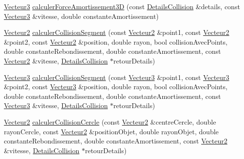 \begin{DoxyCompactItemize}
\hyperlink{group__utilitaire_ga541aa4837ad9250d3a248dc82ee9ad4d}{Vecteur3} \hyperlink{namespaceaidecollision_a2d14adb05414527ee23e93d54f656277}{calculer\-Force\-Amortissement3\-D} (const \hyperlink{classaidecollision_1_1_details_collision}{Details\-Collision} \&details, const \hyperlink{group__utilitaire_ga541aa4837ad9250d3a248dc82ee9ad4d}{Vecteur3} \&vitesse, double constante\-Amortissement)
\item 
\hyperlink{group__utilitaire_ga6f7808e68c967b90bd7e737b7e1b78de}{Vecteur2} \hyperlink{namespaceaidecollision_a85a0be1f19e12cd25413002996b24bb1}{calculer\-Collision\-Segment} (const \hyperlink{group__utilitaire_ga6f7808e68c967b90bd7e737b7e1b78de}{Vecteur2} \&point1, const \hyperlink{group__utilitaire_ga6f7808e68c967b90bd7e737b7e1b78de}{Vecteur2} \&point2, const \hyperlink{group__utilitaire_ga6f7808e68c967b90bd7e737b7e1b78de}{Vecteur2} \&position, double rayon, bool collision\-Avec\-Points, double constante\-Rebondissement, double constante\-Amortissement, const \hyperlink{group__utilitaire_ga6f7808e68c967b90bd7e737b7e1b78de}{Vecteur2} \&vitesse, \hyperlink{classaidecollision_1_1_details_collision}{Details\-Collision} $\ast$retour\-Details)
\item 
\hyperlink{group__utilitaire_ga541aa4837ad9250d3a248dc82ee9ad4d}{Vecteur3} \hyperlink{namespaceaidecollision_a7b4ab7ec2265e5a0c9d85f80b0243cb9}{calculer\-Collision\-Segment} (const \hyperlink{group__utilitaire_ga541aa4837ad9250d3a248dc82ee9ad4d}{Vecteur3} \&point1, const \hyperlink{group__utilitaire_ga541aa4837ad9250d3a248dc82ee9ad4d}{Vecteur3} \&point2, const \hyperlink{group__utilitaire_ga541aa4837ad9250d3a248dc82ee9ad4d}{Vecteur3} \&position, double rayon, bool collision\-Avec\-Points, double constante\-Rebondissement, double constante\-Amortissement, const \hyperlink{group__utilitaire_ga541aa4837ad9250d3a248dc82ee9ad4d}{Vecteur3} \&vitesse, \hyperlink{classaidecollision_1_1_details_collision}{Details\-Collision} $\ast$retour\-Details)
\item 
\hyperlink{group__utilitaire_ga6f7808e68c967b90bd7e737b7e1b78de}{Vecteur2} \hyperlink{namespaceaidecollision_ac7a15fb1d1661183de87524a1a7084fb}{calculer\-Collision\-Cercle} (const \hyperlink{group__utilitaire_ga6f7808e68c967b90bd7e737b7e1b78de}{Vecteur2} \&centre\-Cercle, double rayon\-Cercle, const \hyperlink{group__utilitaire_ga6f7808e68c967b90bd7e737b7e1b78de}{Vecteur2} \&position\-Objet, double rayon\-Objet, double constante\-Rebondissement, double constante\-Amortissement, const \hyperlink{group__utilitaire_ga6f7808e68c967b90bd7e737b7e1b78de}{Vecteur2} \&vitesse, \hyperlink{classaidecollision_1_1_details_collision}{Details\-Collision} $\ast$retour\-Details)

\end{DoxyCompactItemize}
